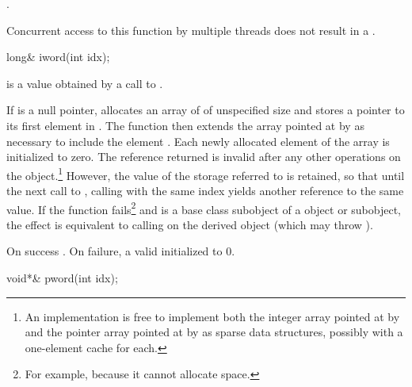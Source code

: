 \begin{itemdescr}
\pnum
\returns
{}
\tcode{++}.

\pnum
\remarks
Concurrent access to this function by multiple threads does not result in a
.
\end{itemdescr}

%
\begin{itemdecl}
long& iword(int idx);
\end{itemdecl}

\begin{itemdescr}
\pnum
\expects
{} is a value obtained by a call to .

\pnum
\effects
If  is a null pointer, allocates an array of
of unspecified size and stores a pointer to its first element in
.
The function then extends the array pointed at by
 as necessary to include the element
.
Each newly allocated element of the array is initialized to zero.
The reference returned is invalid after any other operations on the
object.\footnote{An implementation is free to implement both the integer
array pointed at by  and the pointer array pointed at by
 as sparse data structures, possibly with a one-element
cache for each.}
However, the value of the storage referred to is retained, so
that until the next call to
,
calling
with the same index yields another reference to the same value.
If the function fails\footnote{For example, because it cannot allocate space.}
and
is a base class subobject of a
object or subobject, the effect is equivalent to calling
on the derived object (which may throw
).

\pnum
\returns
On success
.
On failure, a valid
initialized to 0.
\end{itemdescr}

%
\begin{itemdecl}
void*& pword(int idx);
\end{itemdecl}

